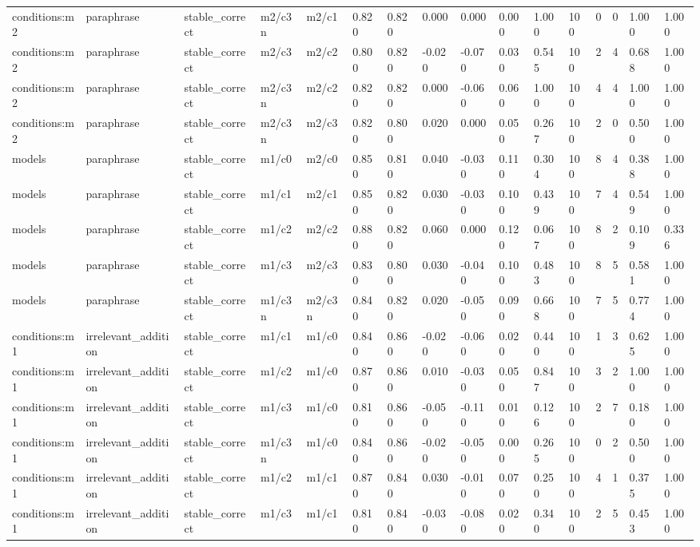 \begin{tabular}{llllllllllllllll}
conditions:m2 & paraphrase & stable\_correct & m2/c3n & m2/c1 & 0.820 & 0.820 & 0.000 & 0.000 & 0.000 & 1.000 & 100 & 0 & 0 & 1.000 & 1.000 \\
conditions:m2 & paraphrase & stable\_correct & m2/c3 & m2/c2 & 0.800 & 0.820 & -0.020 & -0.070 & 0.030 & 0.545 & 100 & 2 & 4 & 0.688 & 1.000 \\
conditions:m2 & paraphrase & stable\_correct & m2/c3n & m2/c2 & 0.820 & 0.820 & 0.000 & -0.060 & 0.060 & 1.000 & 100 & 4 & 4 & 1.000 & 1.000 \\
conditions:m2 & paraphrase & stable\_correct & m2/c3n & m2/c3 & 0.820 & 0.800 & 0.020 & 0.000 & 0.050 & 0.267 & 100 & 2 & 0 & 0.500 & 1.000 \\
models & paraphrase & stable\_correct & m1/c0 & m2/c0 & 0.850 & 0.810 & 0.040 & -0.030 & 0.110 & 0.304 & 100 & 8 & 4 & 0.388 & 1.000 \\
models & paraphrase & stable\_correct & m1/c1 & m2/c1 & 0.850 & 0.820 & 0.030 & -0.030 & 0.100 & 0.439 & 100 & 7 & 4 & 0.549 & 1.000 \\
models & paraphrase & stable\_correct & m1/c2 & m2/c2 & 0.880 & 0.820 & 0.060 & 0.000 & 0.120 & 0.067 & 100 & 8 & 2 & 0.109 & 0.336 \\
models & paraphrase & stable\_correct & m1/c3 & m2/c3 & 0.830 & 0.800 & 0.030 & -0.040 & 0.100 & 0.483 & 100 & 8 & 5 & 0.581 & 1.000 \\
models & paraphrase & stable\_correct & m1/c3n & m2/c3n & 0.840 & 0.820 & 0.020 & -0.050 & 0.090 & 0.668 & 100 & 7 & 5 & 0.774 & 1.000 \\
conditions:m1 & irrelevant\_addition & stable\_correct & m1/c1 & m1/c0 & 0.840 & 0.860 & -0.020 & -0.060 & 0.020 & 0.440 & 100 & 1 & 3 & 0.625 & 1.000 \\
conditions:m1 & irrelevant\_addition & stable\_correct & m1/c2 & m1/c0 & 0.870 & 0.860 & 0.010 & -0.030 & 0.050 & 0.847 & 100 & 3 & 2 & 1.000 & 1.000 \\
conditions:m1 & irrelevant\_addition & stable\_correct & m1/c3 & m1/c0 & 0.810 & 0.860 & -0.050 & -0.110 & 0.010 & 0.126 & 100 & 2 & 7 & 0.180 & 1.000 \\
conditions:m1 & irrelevant\_addition & stable\_correct & m1/c3n & m1/c0 & 0.840 & 0.860 & -0.020 & -0.050 & 0.000 & 0.265 & 100 & 0 & 2 & 0.500 & 1.000 \\
conditions:m1 & irrelevant\_addition & stable\_correct & m1/c2 & m1/c1 & 0.870 & 0.840 & 0.030 & -0.010 & 0.070 & 0.250 & 100 & 4 & 1 & 0.375 & 1.000 \\
conditions:m1 & irrelevant\_addition & stable\_correct & m1/c3 & m1/c1 & 0.810 & 0.840 & -0.030 & -0.080 & 0.020 & 0.340 & 100 & 2 & 5 & 0.453 & 1.000 \\

\end{tabular}
